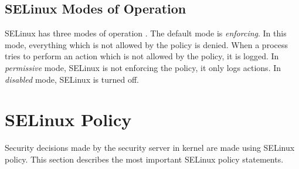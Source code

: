 \subsection{SELinux Modes of Operation}

SELinux has three modes of operation \cite{selinuxguide}. The default mode is
\emph{enforcing}. In this mode, everything which is not allowed by the policy is
denied. When a process tries to perform an action which is not allowed by the
policy, it is logged. In \emph{permissive} mode, SELinux is not enforcing the
policy, it only logs actions. In \emph{disabled} mode, SELinux is turned off.

\section{SELinux Policy}
\label{policy}
Security decisions made by the security server in kernel are made using
SELinux policy. This section describes the most important SELinux policy
statements.


